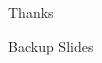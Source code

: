 \documentclass[slidestop,compress,mathserif]{beamer}
\begin{document}




\begin{frame}[c]
	\begin{center}
	\Huge Thanks
	\end{center}
\end{frame}

\begin{frame}[c]
	\begin{center}
	\Huge Backup Slides
	\end{center}
\end{frame}
\end{document}
